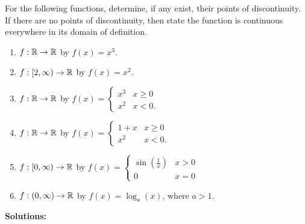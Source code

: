 \begin{example}
\label{ex:ContinuityViaLeftRightLimits}
For the following functions, determine, if any exist, their points of discontinuity. If there are no points of discontinuity, then state the function is continuous everywhere in its domain of definition.

    \begin{enumerate}
\renewcommand{\labelenumi}{(\alph{enumi})}
\setlength{\itemsep}{.2cm}
    \item $f:\mathbb R \to \mathbb R$ by $f(x) = x^3$.

     \item $f:[2, \infty) \to \mathbb R$ by $f(x) = x^2$.

     \item  $f:\mathbb R \to \mathbb R$ by $f(x) =
     \begin{cases} x^3 & x \ge 0 \\
                   x^2 & x < 0.
    \end{cases} $

         \item  $f:\mathbb R \to \mathbb R$ by $f(x) =
     \begin{cases} 1 + x & x \ge 0 \\
                   x^2 & x < 0.
    \end{cases} $

      \item  $f:[0, \infty) \to \mathbb R$ by $f(x) = \begin{cases}
        \sin(\frac{1}{x}) & x >0 \\
        0 & x = 0
    \end{cases}$

     \item $f:(0, \infty) \to \mathbb R$ by $f(x) = \log_a(x)$, where $a>1$.

    \end{enumerate}
\end{example}

\textbf{Solutions:}


